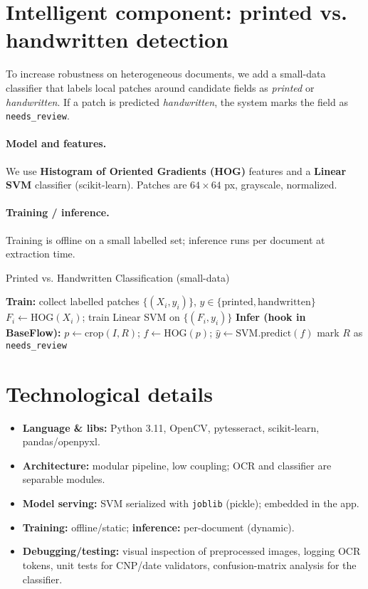 \documentclass[runningheads,a4paper,11pt]{report}
\begin{document}
\section*{Intelligent component: printed vs. handwritten detection}
To increase robustness on heterogeneous documents, we add a small-data classifier that labels local patches around candidate fields as \emph{printed} or \emph{handwritten}. If a patch is predicted \emph{handwritten}, the system marks the field as \texttt{needs\_review}.

\paragraph{Model and features.}
We use \textbf{Histogram of Oriented Gradients (HOG)} features and a \textbf{Linear SVM} classifier (scikit-learn). Patches are $64\times 64$ px, grayscale, normalized.

\paragraph{Training / inference.}
Training is offline on a small labelled set; inference runs per document at extraction time.

\begin{algorithm}[H]
\caption{Printed vs. Handwritten Classification (small-data)}
\label{alg:hwclassifier}
\begin{algorithmic}
  \STATE \textbf{Train:} collect labelled patches $\{(X_i,y_i)\}$, $y\in\{\text{printed},\text{handwritten}\}$
  \STATE $F_i \leftarrow \text{HOG}(X_i)$; train Linear SVM on $\{(F_i,y_i)\}$
  \STATE \textbf{Infer (hook in BaseFlow):}
     \STATE $p \leftarrow \text{crop}(I,R)$; $f \leftarrow \text{HOG}(p)$; $\hat{y}\leftarrow \text{SVM.predict}(f)$
        \STATE mark $R$ as \texttt{needs\_review}
     \ENDIF
  \ENDFOR
\end{algorithmic}
\end{algorithm}

\section*{Technological details}
\begin{itemize}
  \item \textbf{Language \& libs:} Python 3.11, OpenCV, pytesseract, scikit-learn, pandas/openpyxl.
  \item \textbf{Architecture:} modular pipeline, low coupling; OCR and classifier are separable modules.
  \item \textbf{Model serving:} SVM serialized with \texttt{joblib} (pickle); embedded in the app.
  \item \textbf{Training:} offline/static; \textbf{inference:} per-document (dynamic).
  \item \textbf{Debugging/testing:} visual inspection of preprocessed images, logging OCR tokens, unit tests for CNP/date validators, confusion-matrix analysis for the classifier.
\end{itemize}
\end{document}
